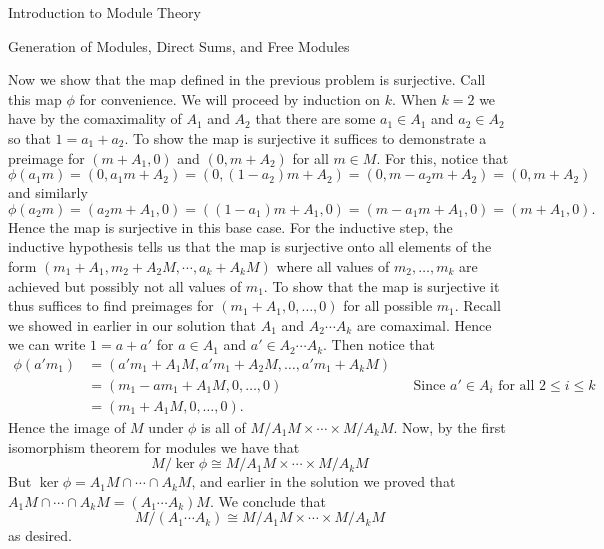 \begin{chapter}{Introduction to Module Theory}
\begin{section}{Generation of Modules, Direct Sums, and Free Modules}
\begin{solution}
Now we show that the map defined in the previous problem is surjective. Call this map $\phi$ for convenience. We will proceed by induction on $k$. When $k=2$ we have by the comaximality of $A_1$ and $A_2$ that there are some $a_1\in A_1$ and $a_2\in A_2$ so that $1=a_1+a_2$. To show the map is surjective it suffices to demonstrate a preimage for $(m+A_1,0)$ and $(0,m+A_2)$ for all $m\in M$. For this, notice that \[\phi(a_1m) = (0, a_1m+A_2) = (0,(1-a_2)m+A_2) = (0,m-a_2m + A_2) = (0,m+A_2)\]
and similarly \[
\phi(a_2m) = (a_2m+A_1, 0) = ((1-a_1)m+A_1,0) = (m-a_1m+A_1,0) = (m+A_1,0). 
\]
Hence the map is surjective in this base case. For the inductive step, the inductive hypothesis tells us that the map is surjective onto all elements of the form $(m_1+A_1,m_2+A_2M,\cdots, a_k+A_kM)$ where all values of $m_2,\ldots, m_k$ are achieved but possibly not all values of $m_1$. To show that the map is surjective it thus suffices to find preimages for $(m_1+A_1,0,\ldots, 0)$ for all possible $m_1$. Recall we showed in earlier in our solution that $A_1$ and $A_2\cdots A_k$ are comaximal. Hence we can write $1 = a+a'$ for $a\in A_1$ and $a'\in A_2\cdots A_k$. Then notice that \begin{align*}
\phi(a'm_1) &= (a'm_1+A_1M, a'm_1+A_2M,\ldots, a'm_1+A_kM)\\
& = (m_1-am_1 +A_1M, 0,\ldots,0)&&\text{Since $a'\in A_i$ for all $2\le i \le k$}\\
& = (m_1+A_1M, 0,\ldots, 0).
\end{align*}
Hence the image of $M$ under $\phi$ is all of $M/A_1M\times \cdots \times M/A_kM$. Now, by the first isomorphism theorem for modules we have that \[
M/\ker\phi \cong M/A_1M\times \cdots \times M/A_kM 
\]
But $\ker\phi = A_1M\cap \cdots \cap A_kM$, and earlier in the solution we proved that $A_1M\cap\cdots \cap A_kM = (A_1\cdots A_k)M$. We conclude that \[
M/(A_1\cdots A_k) \cong M/A_1M\times \cdots \times M/A_kM 
\]
as desired.
\end{solution}\oneperpage




\end{section}
\end{chapter}
